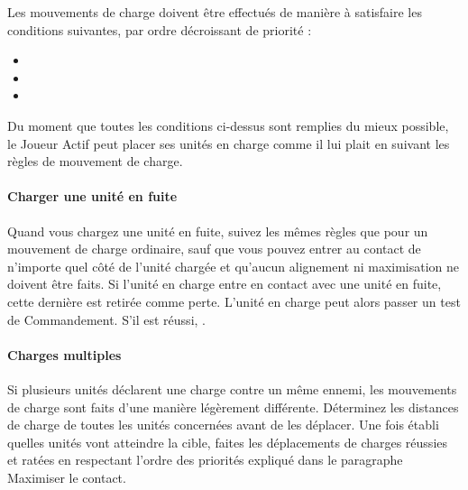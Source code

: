 Les mouvements de charge doivent être effectués de manière à satisfaire les conditions suivantes, par ordre décroissant de priorité :

\begin{itemize}[label={-}]
\item {}
\item {}
\item {}
\end{itemize}

Du moment que toutes les conditions ci-dessus sont remplies du mieux possible, le Joueur Actif peut placer ses unités en charge comme il lui plait en suivant les règles de mouvement de charge.

\paragraph{Charger une unité en fuite}

Quand vous chargez une unité en fuite, suivez les mêmes règles que pour un mouvement de charge ordinaire, sauf que vous pouvez entrer au contact de n'importe quel côté de l'unité chargée et qu'aucun alignement ni maximisation ne doivent être faits. Si l'unité en charge entre en contact avec une unité en fuite, cette dernière est retirée comme perte. L'unité en charge peut alors passer un test de Commandement. S'il est réussi, .

\paragraph{Charges multiples}

Si plusieurs unités déclarent une charge contre un même ennemi, les mouvements de charge sont faits d'une manière légèrement différente. Déterminez les distances de charge de toutes les unités concernées avant de les déplacer. Une fois établi quelles unités vont atteindre la cible, faites les déplacements de charges réussies et ratées en respectant l'ordre des priorités expliqué dans le paragraphe Maximiser le contact.

